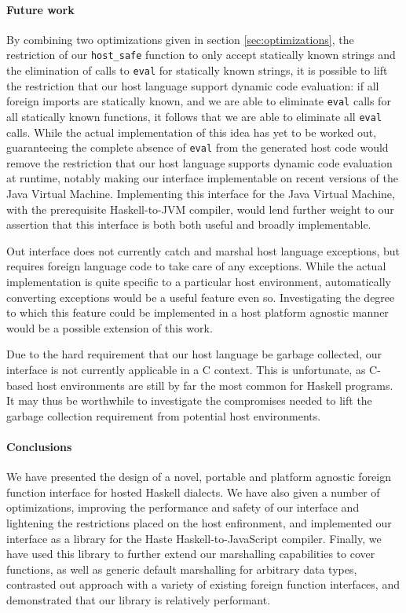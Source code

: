 \documentclass{sigplanconf}
\begin{document}
\paragraph{Future work}
By combining two optimizations given in section \ref{sec:optimizations},
the restriction of our \lstinline!host_safe! function to only accept statically
known strings and the elimination of calls to \lstinline!eval! for statically
known strings, it is possible to lift the restriction that our host language
support dynamic code evaluation: if all foreign imports are statically known,
and we are able to eliminate \lstinline!eval! calls for all statically known
functions, it follows that we are able to eliminate all \lstinline!eval!
calls.
While the actual implementation of this idea has yet to be worked out,
guaranteeing the complete absence of \lstinline!eval! from the generated host
code would remove the restriction that our host language supports dynamic code
evaluation at runtime, notably making our interface implementable on
recent versions of the Java Virtual Machine.
Implementing this interface for the Java Virtual Machine, with the
prerequisite Haskell-to-JVM compiler, would lend further weight to our
assertion that this interface is both both useful and broadly implementable.

Out interface does not currently catch and marshal host language
exceptions, but requires foreign language code to take care of any exceptions.
While the actual implementation is quite specific to a particular
host environment, automatically converting exceptions would be a useful feature
even so. Investigating the degree to which this feature could be implemented
in a host platform agnostic manner would be a possible extension of this work.

Due to the hard requirement that our host language be garbage collected,
our interface is not currently applicable in a C context. This is unfortunate,
as C-based host environments are still by far the most common for Haskell
programs. It may thus be worthwhile to investigate the compromises needed
to lift the garbage collection requirement from potential host environments.

\paragraph{Conclusions}
We have presented the design of a novel, portable and platform agnostic foreign
function interface for hosted Haskell dialects. We have also given a number of
optimizations, improving the performance and safety of our interface
and lightening the restrictions placed on the host enfironment, and implemented
our interface as a library for the Haste Haskell-to-JavaScript compiler.
Finally, we have used this library to further extend our marshalling
capabilities to cover functions, as well as generic default marshalling for
arbitrary data types, contrasted out approach with a variety of existing
foreign function interfaces, and demonstrated that our library is relatively
performant.
\end{document}
